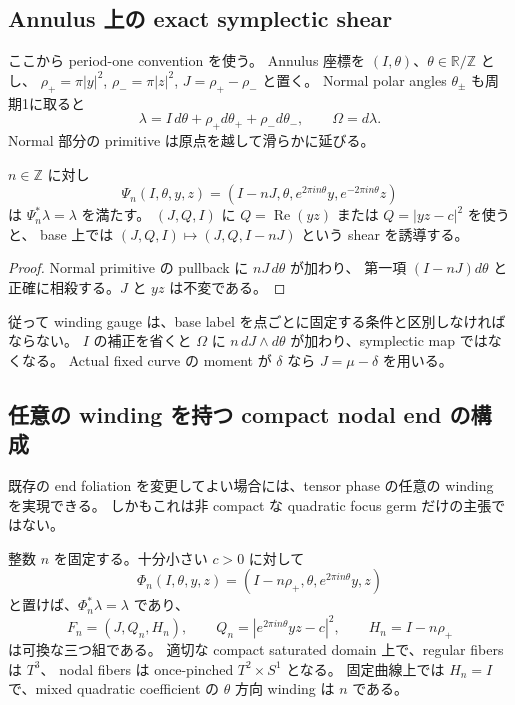 \subsection{Annulus 上の exact symplectic shear}

ここから period-one convention を使う。
Annulus 座標を $(I,\theta)$、$\theta\in\mathbb R/\mathbb Z$ とし、
$\rho_+=\pi|y|^2$, $\rho_-=\pi|z|^2$, $J=\rho_+-\rho_-$ と置く。
Normal polar angles $\theta_\pm$ も周期1に取ると
\[
 \lambda=I\,d\theta+\rho_+d\theta_++\rho_-d\theta_-,\qquad \Omega=d\lambda.
\]
Normal 部分の primitive は原点を越して滑らかに延びる。

\begin{lemma}\label{lc:framing:shear}
$n\in\mathbb Z$ に対し
\[
 \Psi_n(I,\theta,y,z)=
 (I-nJ,\theta,e^{2\pi in\theta}y,e^{-2\pi in\theta}z)
\]
は $\Psi_n^*\lambda=\lambda$ を満たす。
$(J,Q,I)$ に $Q=\operatorname{Re}(yz)$ または $Q=|yz-c|^2$ を使うと、
base 上では $(J,Q,I)\mapsto(J,Q,I-nJ)$ という shear を誘導する。
\end{lemma}

\begin{proof}
Normal primitive の pullback に $nJ\,d\theta$ が加わり、
第一項 $(I-nJ)d\theta$ と正確に相殺する。$J$ と $yz$ は不変である。
\end{proof}

従って winding gauge は、base label を点ごとに固定する条件と区別しなければならない。
$I$ の補正を省くと $\Omega$ に $n\,dJ\wedge d\theta$ が加わり、symplectic map ではなくなる。
Actual fixed curve の moment が $\delta$ なら $J=\mu-\delta$ を用いる。

\subsection{任意の winding を持つ compact nodal end の構成}

既存の end foliation を変更してよい場合には、tensor phase の任意の winding を実現できる。
しかもこれは非 compact な quadratic focus germ だけの主張ではない。

\begin{proposition}\label{lc:framing:compact-end}
整数 $n$ を固定する。十分小さい $c>0$ に対して
\[
 \Phi_n(I,\theta,y,z)=(I-n\rho_+,\theta,e^{2\pi in\theta}y,z)
\]
と置けば、$\Phi_n^*\lambda=\lambda$ であり、
\[
 F_n=(J,Q_n,H_n),\qquad
 Q_n=|e^{2\pi in\theta}yz-c|^2,\qquad H_n=I-n\rho_+
\]
は可換な三つ組である。
適切な compact saturated domain 上で、regular fibers は $T^3$、
nodal fibers は once-pinched $T^2\times S^1$ となる。
固定曲線上では $H_n=I$ で、mixed quadratic coefficient の $\theta$ 方向 winding は $n$ である。
\end{proposition}

